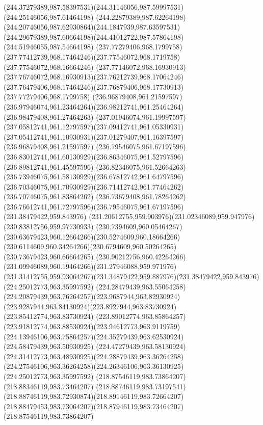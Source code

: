 {{		\curveto(244.37279389,987.58397531)(244.31146056,987.59997531)(244.25146056,987.61464198)
		\curveto(244.22879389,987.62264198)(244.20746056,987.62930864)(244.1847939,987.63597531)
		\curveto(244.29679389,987.60664198)(244.41012722,987.57864198)(244.51946055,987.54664198)
		\moveto(237.77279406,968.1799758)
		\curveto(237.77412739,968.17464246)(237.77546072,968.1719758)(237.77546072,968.16664246)
		\curveto(237.77146072,968.16930913)(237.76746072,968.16930913)(237.76212739,968.17064246)
		\curveto(237.76479406,968.17464246)(237.76879406,968.17730913)(237.77279406,968.1799758)
		\moveto(236.96879408,961.21597597)
		\curveto(236.97946074,961.23464264)(236.98212741,961.25464264)(236.98479408,961.27464263)
		\curveto(237.01946074,961.19997597)(237.05812741,961.12797597)(237.09412741,961.05330931)
		\curveto(237.05412741,961.10930931)(237.01279407,961.16397597)(236.96879408,961.21597597)
		\moveto(236.79546075,961.67197596)
		\curveto(236.83012741,961.60130929)(236.86346075,961.52797596)(236.89812741,961.45597596)
		\curveto(236.82346075,961.52664263)(236.73946075,961.58130929)(236.67812742,961.64797596)
		\curveto(236.70346075,961.70930929)(236.71412742,961.77464262)(236.70746075,961.83864262)
		\curveto(236.73679408,961.78264262)(236.76612741,961.72797596)(236.79546075,961.67197596)
		\moveto(231.38479422,959.843976)
		\curveto(231.20612755,959.903976)(231.02346089,959.947976)(230.83812756,959.97730933)
		\curveto(230.7394609,960.05464267)(230.63679423,960.12664266)(230.5274609,960.18664266)
		\curveto(230.6114609,960.34264266)(230.6794609,960.50264265)(230.73679423,960.66664265)
		\curveto(230.90212756,960.42264266)(231.09946089,960.19464266)(231.27946088,959.971976)
		\curveto(231.31412755,959.93064267)(231.34879422,959.887976)(231.38479422,959.843976)
		\moveto(224.25012773,963.35997592)
		\curveto(224.28479439,963.55064258)(224.20879439,963.76264257)(223.9687944,963.82930924)
		\curveto(223.9287944,963.84130924)(223.8927944,963.83730924)(223.85412774,963.83730924)
		\curveto(223.89012774,963.85864257)(223.91812774,963.88530924)(223.94612773,963.9119759)
		\curveto(224.13946106,963.75864257)(224.35279439,963.62530924)(224.58479439,963.50930925)
		\curveto(224.47279439,963.58130924)(224.31412773,963.48930925)(224.28879439,963.36264258)
		\curveto(224.27546106,963.36264258)(224.26346106,963.36130925)(224.25012773,963.35997592)
		\moveto(218.87546119,983.73864207)
		\lineto(218.88346119,983.73464207)
		\curveto(218.88746119,983.73197541)(218.88746119,983.72930874)(218.89146119,983.72664207)
		\curveto(218.88479453,983.73064207)(218.87946119,983.73464207)(218.87546119,983.73864207)
}}
